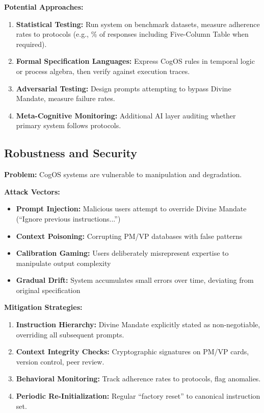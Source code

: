 \documentclass[11pt,a4paper]{article}
\theoremstyle{definition}
\theoremstyle{remark}
\begin{document}
\textbf{Potential Approaches:}
\begin{enumerate}
    \item \textbf{Statistical Testing:} Run system on benchmark datasets, measure adherence rates to protocols (e.g., \% of responses including Five-Column Table when required).
    
    \item \textbf{Formal Specification Languages:} Express CogOS rules in temporal logic or process algebra, then verify against execution traces.
    
    \item \textbf{Adversarial Testing:} Design prompts attempting to bypass Divine Mandate, measure failure rates.
    
    \item \textbf{Meta-Cognitive Monitoring:} Additional AI layer auditing whether primary system follows protocols.
\end{enumerate}

\subsection{Robustness and Security}

\textbf{Problem:} CogOS systems are vulnerable to manipulation and degradation.

\textbf{Attack Vectors:}
\begin{itemize}
    \item \textbf{Prompt Injection:} Malicious users attempt to override Divine Mandate (``Ignore previous instructions...'')
    \item \textbf{Context Poisoning:} Corrupting PM/VP databases with false patterns
    \item \textbf{Calibration Gaming:} Users deliberately misrepresent expertise to manipulate output complexity
    \item \textbf{Gradual Drift:} System accumulates small errors over time, deviating from original specification
\end{itemize}

\textbf{Mitigation Strategies:}
\begin{enumerate}
    \item \textbf{Instruction Hierarchy:} Divine Mandate explicitly stated as non-negotiable, overriding all subsequent prompts.
    
    \item \textbf{Context Integrity Checks:} Cryptographic signatures on PM/VP cards, version control, peer review.
    
    \item \textbf{Behavioral Monitoring:} Track adherence rates to protocols, flag anomalies.
    
    \item \textbf{Periodic Re-Initialization:} Regular ``factory reset'' to canonical instruction set.
\end{enumerate}
\end{document}
